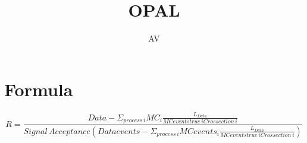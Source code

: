 \documentclass[a4paper,10pt]{article}
\title{OPAL}
\author{AV}
\begin{document}
\maketitle

\begin{abstract}

\end{abstract}

\section{Formula}




$$
R=\frac{Data-\Sigma_{process\,i}MC_i\frac{L_{Data}}{MCeventstrue\,i Crossection\,i}}{Signal\,Acceptance (Dataevents-\Sigma_{process\,i}MCevents_i\frac{L_{Data}}{MCeventstrue\,i Crossection\,i} )}
$$
\end{document}
